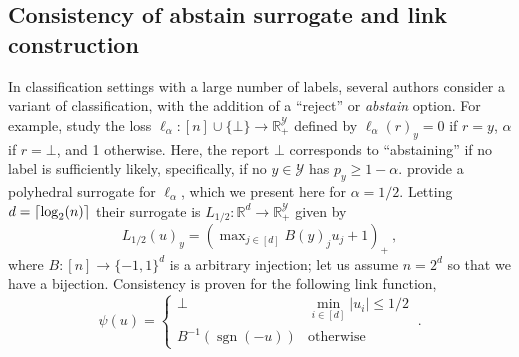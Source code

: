 \documentclass[12pt]{article}
\newcommand{\reals}{\mathbb{R}}
\newcommand{\Y}{\mathcal{Y}}
\DeclarePairedDelimiter\ceil{\lceil}{\rceil}
\newcommand{\ellabs}[1]{\ell_{#1}}
\DeclareMathOperator*{\sgn}{sgn}
\begin{document}
\subsection{Consistency of abstain surrogate and link construction}
\label{sec:abstain}

In classification settings with a large number of labels, several authors consider a variant of classification, with the addition of a ``reject'' or \emph{abstain} option.
For example, \citet{ramaswamy2018consistent} study the loss $\ellabs{\alpha} : [n] \cup \{\bot\} \to \reals^\Y_+$ defined by $\ellabs{\alpha}(r)_y = 0$ if $r=y$, $\alpha$ if $r = \bot$, and 1 otherwise.
Here, the report $\bot$ corresponds to ``abstaining'' if no label is sufficiently likely, specifically, if no $y\in\Y$ has $p_y \geq 1-\alpha$.
\citet{ramaswamy2018consistent} provide a polyhedral surrogate for $\ellabs{\alpha}$, which we present here for $\alpha=1/2$.
Letting $d = \ceil{\log_2(n)}$ their surrogate is $L_{1/2} : \reals^d \to \reals^\Y_+$ given by
\begin{equation}\label{eq:abstain-surrogate}
L_{1/2}(u)_y = \left(\max\nolimits_{j \in [d]}B(y)_j u_j + 1\right)_+~,
\end{equation}
where $B:[n]\to\{-1,1\}^d$ is a arbitrary injection; let us assume $n = 2^d$ so that we have a bijection.
Consistency is proven for the following link function,
\begin{equation}\label{eq:abstain-link}
  \psi(u) = \begin{cases}
	\bot & \min_{i \in [d]} |u_i| \leq 1/2\\
	B^{-1}(\sgn(-u)) &\text{otherwise}
  \end{cases}~.
\end{equation}
\end{document}
